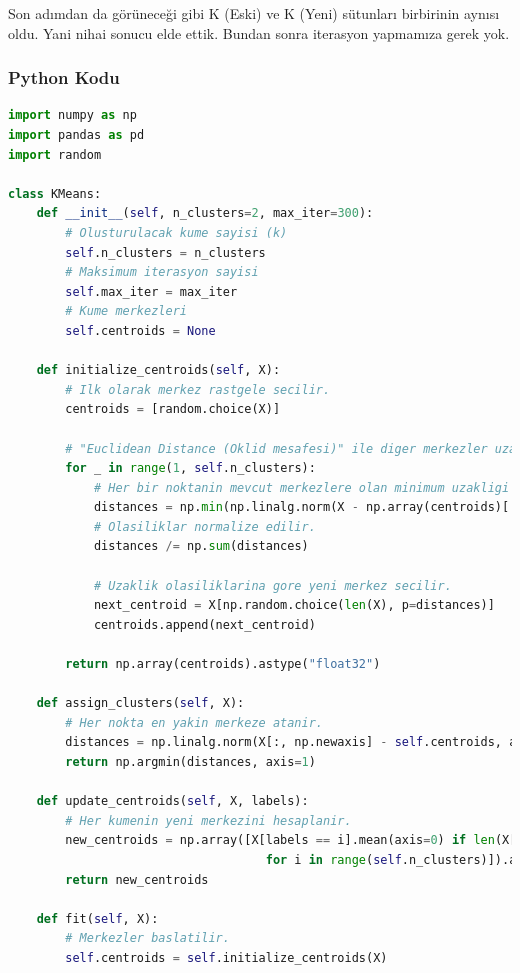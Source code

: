 Son adımdan da görüneceği gibi K (Eski) ve K (Yeni) sütunları birbirinin aynısı oldu. Yani nihai sonucu elde ettik. Bundan sonra iterasyon yapmamıza gerek yok. 


\subsubsection{Python Kodu}

\begin{lstlisting}[language=Python, caption=Scikit-learn'de KMeans örneği.]
import numpy as np
import pandas as pd
import random

class KMeans:
    def __init__(self, n_clusters=2, max_iter=300):
        # Olusturulacak kume sayisi (k)
        self.n_clusters = n_clusters
        # Maksimum iterasyon sayisi
        self.max_iter = max_iter
        # Kume merkezleri
        self.centroids = None

    def initialize_centroids(self, X):
        # Ilk olarak merkez rastgele secilir.
        centroids = [random.choice(X)]

        # "Euclidean Distance (Oklid mesafesi)" ile diger merkezler uzakliklara gore secilir. (K-Means++)
        for _ in range(1, self.n_clusters):
            # Her bir noktanin mevcut merkezlere olan minimum uzakligi hesaplanir.
            distances = np.min(np.linalg.norm(X - np.array(centroids)[:, np.newaxis], axis=2), axis=0)
            # Olasiliklar normalize edilir.
            distances /= np.sum(distances)

            # Uzaklik olasiliklarina gore yeni merkez secilir.
            next_centroid = X[np.random.choice(len(X), p=distances)]
            centroids.append(next_centroid)

        return np.array(centroids).astype("float32")

    def assign_clusters(self, X):
        # Her nokta en yakin merkeze atanir.
        distances = np.linalg.norm(X[:, np.newaxis] - self.centroids, axis=2).astype("float32")
        return np.argmin(distances, axis=1)

    def update_centroids(self, X, labels):
        # Her kumenin yeni merkezini hesaplanir.
        new_centroids = np.array([X[labels == i].mean(axis=0) if len(X[labels == i]) > 0 else self.centroids[i]
                                    for i in range(self.n_clusters)]).astype("float32")
        return new_centroids

    def fit(self, X):
        # Merkezler baslatilir.
        self.centroids = self.initialize_centroids(X)


\end{lstlisting}
